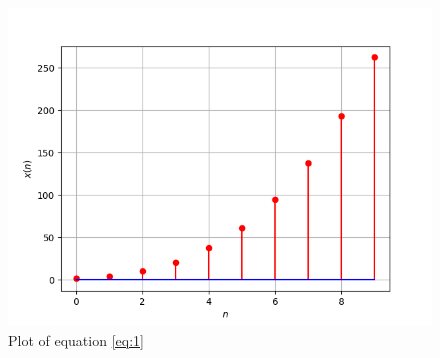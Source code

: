 \documentclass{article}
\begin{document}
\newpage
\begin{figure}
    \centering
    \includegraphics{figs/plot.png}
    \caption{Plot of equation \eqref{eq:1}}
    \label{fig:plot}
\end{figure}
\end{document}
